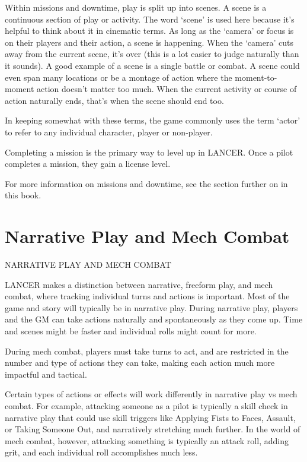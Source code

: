Within missions and downtime, play is split up into scenes. A scene is a continuous section of
play or activity. The word ‘scene’ is used here because it’s helpful to think about it in cinematic
terms. As long as the ‘camera’ or focus is on their players and their action, a scene is happening.
When the ‘camera’ cuts away from the current scene, it’s over (this is a lot easier to judge
naturally than it sounds). A good example of a scene is a single battle or combat. A scene could
even span many locations or be a montage of action where the moment-to-moment action
doesn’t matter too much. When the current activity or course of action naturally ends, that’s
when the scene should end too.

In keeping somewhat with these terms, the game commonly uses the term ‘actor’ to refer to any
individual character, player or non-player.




Completing a mission is the primary way to level up in LANCER. Once a pilot completes a
mission, they gain a license level.


For more information on missions and downtime, see the section further on in this book.


\chapter{Narrative Play and Mech Combat}
                          NARRATIVE PLAY AND MECH COMBAT

LANCER makes a distinction between narrative, freeform play, and mech combat, where tracking
individual turns and actions is important. Most of the game and story will typically be in narrative
play. During narrative play, players and the GM can take actions naturally and spontaneously as
they come up. Time and scenes might be faster and individual rolls might count for more.

	        During mech combat, players must take turns to act, and are restricted in the number
and type of actions they can take, making each action much more impactful and tactical.

	        Certain types of actions or effects will work differently in narrative play vs mech combat.
For example, attacking someone as a pilot is typically a skill check in narrative play that could
use skill triggers like Applying Fists to Faces, Assault, or Taking Someone Out, and narratively
stretching much further. In the world of mech combat, however, attacking something is typically
an attack roll, adding grit, and each individual roll accomplishes much less.


